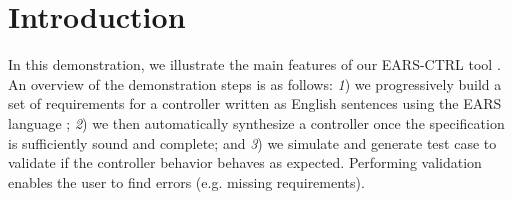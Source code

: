 \vspace{-1cm}
\section{Introduction}
\label{sec:intro}
\vspace{-.3cm}
In this demonstration, we illustrate the main features of our \textsf{EARS-CTRL}
tool \cite{EARSProject}.
An overview of the demonstration steps is as follows: \emph{1}) we
progressively build a set of requirements for a controller written as English
sentences using the EARS language \cite{EARS}; \emph{2}) we then automatically
synthesize a controller once the specification is sufficiently sound and
complete; and \emph{3}) we simulate and generate test case to
validate if the controller behavior behaves as expected.
Performing validation enables the user to find errors (e.g. missing
requirements).